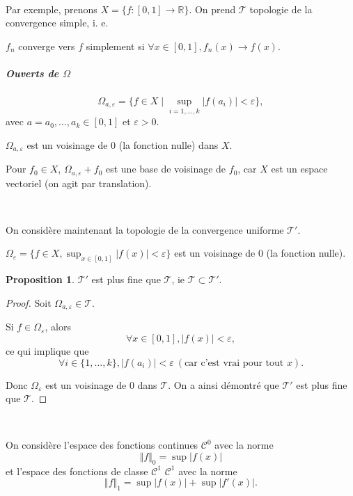 \documentclass[french]{book}
\theoremstyle{definition}
\newtheorem{protoproposition}{Proposition}[section]
\newenvironment{prop}
    {\colorlet{shadecolor}{blue!5}\begin{shaded}\begin{protoproposition}}
    {\end{protoproposition}\end{shaded}}
\newcommand{\lesss}{<}
\newcommand{\less}{\lesss}
\newcommand{\biggg}{>}
\newcommand{\bg}{\biggg}
\begin{document}
\

Par exemple, prenons $X = \{ f :[0, 1] \to \mathbb{R} \} $. On prend $\mathscr{T} $ topologie de la convergence simple, i. e.

$f_n $ converge vers $ f$ simplement si $\forall x \in [0, 1], f_n(x) \to f(x)$.

\subparagraph{Ouverts de $\Omega$}

$$\Omega _{a, \varepsilon } = \{ f \in X \mid \sup _{i =1, \dots, k} \lvert f(a_i) \rvert \less \varepsilon \}, $$ avec $a = a_0, \dots, a_k \in [0, 1]$ et $\varepsilon  \bg 0$.

$\Omega _{a, \varepsilon } $ est un voisinage de 0 (la fonction nulle) dans $X$.

Pour $f_0 \in X$, $\Omega _{a, \varepsilon } + f_0$ est une base de voisinage de $f_0$, car $X$ est un espace vectoriel (on agit par translation).

\

On considère maintenant la topologie de la convergence uniforme $\mathscr{T}' $.

$\Omega _{\varepsilon } = \{ f \in X, \sup_{ x \in [0, 1] } \lvert f(x) \rvert \less \varepsilon   \} $ est un voisinage de $0$ (la fonction nulle).

\begin{prop}
  $\mathscr{T}' $ est plus fine que $\mathscr{T} $, ie $\mathscr{T} \subset \mathscr{T}' $.
\end{prop}

\begin{proof}
  Soit $\Omega _{a, \varepsilon } \in \mathscr{T}  $.


  Si $f \in \Omega _{\varepsilon }$, alors $$\forall x \in [0, 1], \lvert f(x) \rvert \less \varepsilon, $$ ce qui implique que $$ \forall i \in \{ 1, \dots, k \}, \lvert f(a_i) \rvert \less \varepsilon \ (\text{car c'est vrai pour tout } x). $$

   Donc $\Omega  _{\varepsilon } $ est un voisinage de 0 dans $\mathscr{T} $. On a ainsi démontré que $\mathscr{T}' $ est plus fine que $\mathscr{T} $.

\end{proof}

\

On considère l'espace des fonctions continues $\mathcal{C}^0$ avec la norme $$ \Vert f \Vert _{0} = \sup_{  } \lvert f(x) \rvert $$ et l'espace des fonctions de classe $\mathcal{C}^1$ $\mathcal{C}^1$ avec la norme $$\Vert f \Vert _{1} = \sup \lvert f(x) \rvert + \sup \lvert f'(x) \rvert.$$
\end{document}
